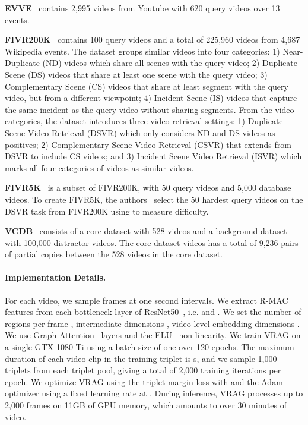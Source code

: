 \documentclass[letterpaper]{article} \usepackage{aaai22}  \usepackage{times}  \usepackage{helvet}  \usepackage{courier}  \usepackage[hyphens]{url}  \usepackage{graphicx} \urlstyle{rm} \usepackage{amsmath}
\begin{document}
\noindent\textbf{EVVE}~\cite{dataset:evve} contains 2,995 videos from Youtube with 620 query videos over 13 events. 

\noindent \textbf{FIVR200K}~\cite{dataset:fivr200k} contains 100 query videos and a total of 225,960 videos from 4,687 Wikipedia events. The dataset groups similar videos into four categories: 1) Near-Duplicate (ND) videos which share all scenes with the query video; 2) Duplicate Scene (DS) videos that share at least one scene with the query video; 3) Complementary Scene (CS) videos that share at least segment with the query video, but from a different viewpoint; 4) Incident Scene (IS) videos that capture the same incident as the query video without sharing segments.
From the video categories, the dataset introduces three video retrieval settings: 1) Duplicate Scene Video Retrieval (DSVR) which only considers ND and DS videos as positives; 2) Complementary Scene Video Retrieval (CSVR) that extends from DSVR to include CS videos; and 3) Incident Scene Video Retrieval (ISVR) which marks all four categories of videos as similar videos.

\vspace{0mm}
\noindent \textbf{FIVR5K}~\cite{dataset:fivr200k, kordopatiszilos2019visil} is a subset of FIVR200K, with 50 query videos and 5,000 database videos. To create FIVR5K, the authors~\cite{kordopatiszilos2019visil} select the 50 hardest query videos on the DSVR task from FIVR200K using \cite{lbow} to measure difficulty.

\vspace{0mm}
\noindent \textbf{VCDB}~\cite{dataset:vcdb} consists of a core dataset with 528 videos and a background dataset with 100,000 distractor videos. The core dataset videos has a total of 9,236 pairs of partial copies between the 528 videos in the core dataset.

\paragraph{Implementation Details.}
For each video, we sample frames at one second intervals. We extract R-MAC features from each bottleneck layer of ResNet50~\cite{resnet}, i.e.  and . We set the number of regions per frame , intermediate dimensions , video-level embedding dimensions . We use  Graph Attention~\cite{graph-attention} layers and the ELU~\cite{nonlinearity:elu} non-linearity.
We train VRAG on a single GTX 1080 Ti using a batch size of one over 120 epochs. The maximum duration of each video clip in the training triplet is s, and we sample 1,000 triplets from each triplet pool, giving a total of 2,000 training iterations per epoch. We optimize VRAG using the triplet margin loss with  and the Adam~\cite{optimizer:adam} optimizer using a fixed learning rate at . During inference, VRAG processes up to 2,000 frames on 11GB of GPU memory, which amounts to over 30 minutes of video.
\end{document}
